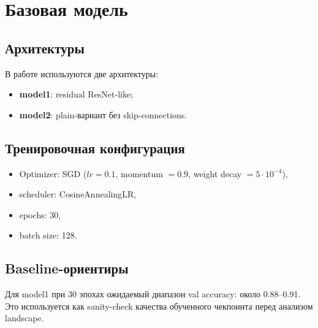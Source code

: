 \section{Базовая модель}

\subsection{Архитектуры}
В работе используются две архитектуры:
\begin{itemize}
    \item \textbf{model1}: residual ResNet-like;
    \item \textbf{model2}: plain-вариант без skip-connections.
\end{itemize}

\subsection{Тренировочная конфигурация}
\begin{itemize}
    \item Optimizer: SGD ($lr=0.1$, momentum $=0.9$, weight decay $=5 \cdot 10^{-4}$),
    \item scheduler: CosineAnnealingLR,
    \item epochs: 30,
    \item batch size: 128.
\end{itemize}

\subsection{Baseline-ориентиры}
Для model1 при 30 эпохах ожидаемый диапазон val accuracy: около 0.88--0.91. Это используется как sanity-check качества обученного чекпоинта перед анализом landscape.
